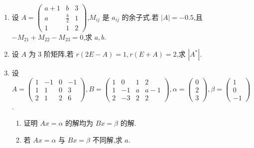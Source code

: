 \begin{enumerate}
	\item 设 $A = \begin{pmatrix} a+1 & b & 3 \\ a & \frac{b}{2} & 1 \\ 1 & 1 & 2 \end{pmatrix}$,$M_{ij}$ 是 $a_{ij}$ 的余子式.若 $|A| = -0.5$,且 $-M_{21} + M_{22} - M_{23} = 0$,求 $a, b$.
	
	\item 设 $A$ 为 3 阶矩阵,若 $r(2E-A) = 1, r(E+A) = 2$,求 $|A^{*}|$.
	
	\item 设 $A = \begin{pmatrix} 1 & -1 & 0 & -1 \\ 1 & 1 & 0 & 3 \\ 2 & 1 & 2 & 6 \end{pmatrix}, B = \begin{pmatrix} 1 & 0 & 1 & 2 \\ 1 & -1 & a & a - 1 \\ 2 & -3 & 2 & 2 \end{pmatrix}, \alpha = \begin{pmatrix} 0 \\ 2 \\ 3 \end{pmatrix}, \beta = \begin{pmatrix} 1 \\ 0 \\ -1 \end{pmatrix}$.
	\begin{enumerate}
		\item 证明 $Ax=\alpha$ 的解均为 $Bx=\beta$ 的解.
		\item 若 $Ax=\alpha$ 与 $Bx=\beta$ 不同解,求 $a$.
	\end{enumerate}
	

	
\end{enumerate}